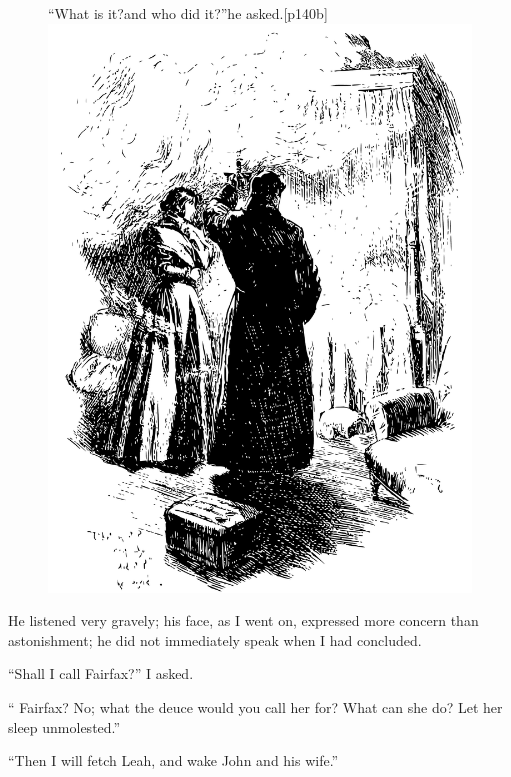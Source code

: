 \begin{figure}
	\begin{sidecaption}{\enquote{What is it?\linebreak and who did it?}\linebreak he asked.}[p140b]
		\centering
		\includegraphics[width=\linewidth]{images/p140b.pdf}
	\end{sidecaption}
\end{figure}

He listened very gravely; his face, as I went on, expressed more concern
than astonishment; he did not immediately speak when I had concluded.

\enquote{Shall I call \Mrs{} Fairfax?} I asked.

\enquote{\Mrs{} Fairfax? No; what the deuce would you call her for? What
	can she do? Let her sleep unmolested.}

\enquote{Then I will fetch Leah, and wake John and his wife.}

